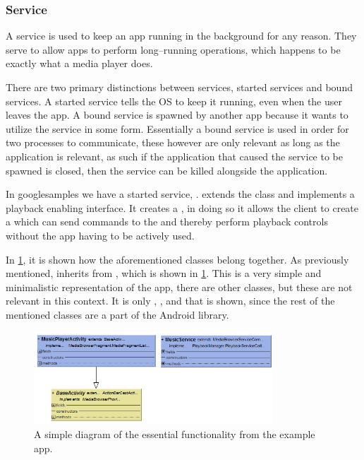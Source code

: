 \subsubsection{Service}\label{subsec:services}
A service is used to keep an app running in the background for any reason.
They serve to allow apps to perform long--running operations, which happens to be exactly what a media player does.

There are two primary distinctions between services, started services and bound services.
A started service tells the OS to keep it running, even when the user leaves the app.
A bound service is spawned by another app because it wants to utilize the service in some form.
Essentially a bound service is used in order for two processes to communicate, these however are only relevant as long as the application is relevant, as such if the application that caused the service to be spawned is closed, then the service can be killed alongside the application.\cite{androidFundamentals}

In googlesamples we have a started service, .
\sloppy{} extends the  class and implements a playback enabling interface.
It creates a , in doing so it allows the client to create a  which can send commands to the  and thereby perform playback controls without the app having to be actively used.

In \cref{fig:simple_class_diagram}, it is shown how the aforementioned classes belong together.
As previously mentioned,  inherits from , which is shown in \cref{fig:simple_class_diagram}.
This is a very simple and minimalistic representation of the app, there are other classes, but these are not relevant in this context.
It is only , , and  that is shown, since the rest of the mentioned classes are a part of the Android library. 

\begin{figure}[!bht]
    \centering
    \includegraphics[width=0.8\textwidth]{img/simple_class_diagram.png}
    \caption{A simple diagram of the essential functionality from the example app.}
    \label{fig:simple_class_diagram}
\end{figure}
